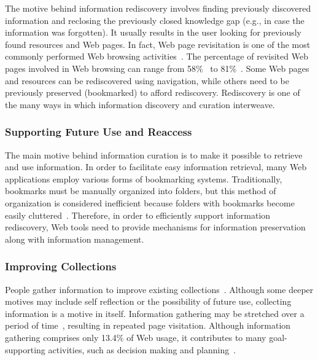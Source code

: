 \documentclass{sigchi}
\begin{document}
{{{The motive behind information rediscovery involves finding previously discovered information and reclosing the previously closed knowledge gap (e.g., in case the information was forgotten). It usually results in the user looking for previously found resources and Web pages. In fact, Web page revisitation is one of the most commonly performed Web browsing activities~\cite{adar2008large,cockburn2003improving}. The percentage of revisited Web pages involved in Web browsing can range from 58\%~\cite{tauscher1997people} to 81\%~\cite{cockburn2001web}. 
Some Web pages and resources can be rediscovered using navigation, while others need to be previously preserved (bookmarked) to afford rediscovery. Rediscovery is one of the many ways in which information discovery and curation interweave. 
}

{\subsubsection{Supporting Future Use and Reaccess}
The main motive behind information curation is to make it possible to retrieve and use information. In order to facilitate easy information retrieval, many Web applications employ various forms of bookmarking systems. Traditionally, bookmarks must be manually organized into folders, but this method of organization is considered inefficient because folders with bookmarks become easily cluttered~\cite{abrams1998information}. Therefore, in order to efficiently support information rediscovery, Web tools need to provide mechanisms for information preservation along with information management.
}

{\subsubsection{Improving Collections}
People gather information to improve existing collections~\cite{lindley2012s}. Although some deeper motives may include self reflection or the possibility of future use, collecting information is a motive in itself. Information gathering may be stretched over a period of time~\cite{kellar2006goal}, resulting in repeated page visitation. Although information gathering comprises only 13.4\% of Web usage, it contributes to many goal-supporting activities, such as decision making and planning~\cite{kellar2006goal}.

}}}
\end{document}
